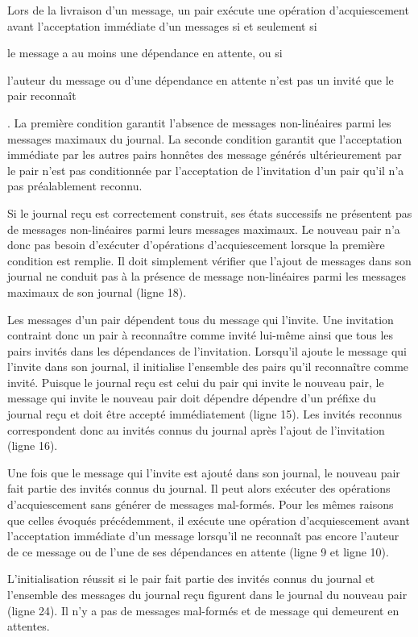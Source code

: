Lors de la livraison d'un message, un pair exécute une opération d'acquiescement avant l'acceptation immédiate d'un messages si et seulement si \begin{inlinelist}
\item le message a au moins une dépendance en attente, ou si
\item l'auteur du message ou d'une dépendance en attente n'est pas un invité que le pair reconnaît
\end{inlinelist}.
La première condition garantit l'absence de messages non-linéaires parmi les messages maximaux du journal.
La seconde condition garantit que l'acceptation immédiate par les autres pairs honnêtes des message générés ultérieurement par le pair n'est pas conditionnée par l'acceptation de l'invitation d'un pair qu'il n'a pas préalablement reconnu.

Si le journal reçu est correctement construit, ses états successifs ne présentent pas de messages non-linéaires parmi leurs messages maximaux.
Le nouveau pair n'a donc pas besoin d'exécuter d'opérations d'acquiescement lorsque la première condition est remplie.
Il doit simplement vérifier que l'ajout de messages dans son journal ne conduit pas à la présence de message non-linéaires parmi les messages maximaux de son journal (ligne 18).

Les messages d'un pair dépendent tous du message qui l'invite.
Une invitation contraint donc un pair à reconnaître comme invité lui-même ainsi que tous les pairs invités dans les dépendances de l'invitation.
Lorsqu'il ajoute le message qui l'invite dans son journal, il initialise l'ensemble des pairs qu'il reconnaître comme invité.
Puisque le journal reçu est celui du pair qui invite le nouveau pair, le message qui invite le nouveau pair doit dépendre dépendre d'un préfixe du journal reçu et doit être accepté immédiatement (ligne 15).
Les invités reconnus correspondent donc au invités connus du journal après l'ajout de l'invitation (ligne 16).

Une fois que le message qui l'invite est ajouté dans son journal, le nouveau pair fait partie des invités connus du journal.
Il peut alors exécuter des opérations d'acquiescement sans générer de messages mal-formés.
Pour les mêmes raisons que celles évoqués précédemment, il exécute une opération d'acquiescement avant l'acceptation immédiate d'un message lorsqu'il ne reconnaît pas encore l'auteur de ce message ou de l'une de ses dépendances en attente (ligne 9 et ligne 10).

L'initialisation réussit si le pair fait partie des invités connus du journal et l'ensemble des messages du journal reçu figurent dans le journal du nouveau pair (ligne 24).
Il n'y a pas de messages mal-formés et de message qui demeurent en attentes.


